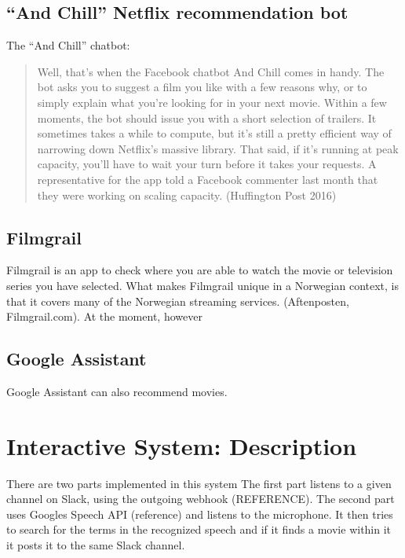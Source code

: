 \documentclass[11pt,fleqn]{book} %
\begin{document}
\section{“And Chill” Netflix recommendation bot}
The “And Chill” chatbot:
\begin{quote}
Well, that’s when the Facebook chatbot And Chill comes in handy. The bot asks you to suggest a film you like with a few reasons why, or to simply explain what you’re looking for in your next movie.  
Within a few moments, the bot should issue you with a short selection of trailers. It sometimes takes a while to compute, but it’s still a pretty efficient way of narrowing down Netflix’s massive library.
That said, if it’s running at peak capacity, you’ll have to wait your turn before it takes your requests. A representative for the app told a Facebook commenter last month that they were working on scaling capacity. (Huffington Post 2016)
\end{quote}
\section{Filmgrail}
Filmgrail is an app to check where you are able to watch the movie or television series you have selected. What makes Filmgrail unique in a Norwegian context, is that it covers many of the Norwegian streaming services. (Aftenposten, Filmgrail.com). At the moment, however 
\section{Google Assistant}
Google Assistant can also recommend movies.




\chapter{Interactive System: Description}
There are two parts implemented in this system
The first part listens to a given channel on Slack, using the outgoing webhook (REFERENCE). 
The second part uses Googles Speech API (reference) and listens to the microphone. It then tries to search for the terms in the recognized speech and if it finds a movie within it it posts it to the same Slack channel.
\end{document}
